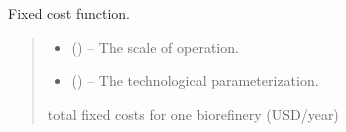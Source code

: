 \documentclass[letterpaper,10pt,english]{sphinxmanual}
\begin{document}
\begin{fulllineitems}
\label{\detokenize{technology:technology.tutorial_biorefinery.fixed_cost}}
\pysigstartsignatures
{}
\pysigstopsignatures
\sphinxAtStartPar
Fixed cost function.
\begin{quote}\begin{description}
\begin{itemize}
\item {} 
\sphinxAtStartPar
{} (\sphinxstyleliteralemphasis{\sphinxupquote{ {[}}}\sphinxstyleliteralemphasis{\sphinxupquote{{]}}}) – The scale of operation.

\item {} 
\sphinxAtStartPar
{} () – The technological parameterization.

\end{itemize}

\sphinxAtStartPar
total fixed costs for one biorefinery (USD/year)

\end{description}\end{quote}

\end{fulllineitems}

\end{document}
